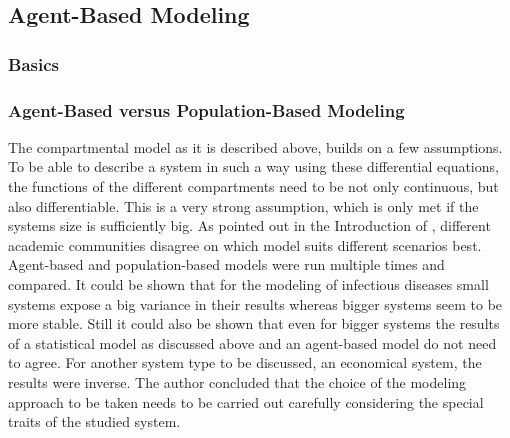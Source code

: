 \subsection{Agent-Based Modeling}\label{chap:agentBasedModelBasics}

\subsubsection{Basics}
\subsubsection{Agent-Based versus Population-Based Modeling}
The compartmental model as it is described above, builds on a few assumptions. To be able to describe a system in such a way using these differential equations, the functions of the different compartments need to be not only continuous, but also differentiable. This is a very strong assumption, which is only met if the systems size is sufficiently big. As pointed out in the Introduction of \citep{bosse2012comparative}, different academic communities disagree on which model suits different scenarios best. Agent-based and population-based models were run multiple times and compared. It could be shown that for the modeling of infectious diseases small systems expose a big variance in their results whereas bigger systems seem to be more stable. Still it could also be shown that even for bigger systems the results of a statistical model as discussed above and an agent-based model do not need to agree. For another system type to be discussed, an economical system, the results were inverse. The author concluded that the choice of the modeling approach to be taken needs to be carried out carefully considering the special traits of the studied system.
